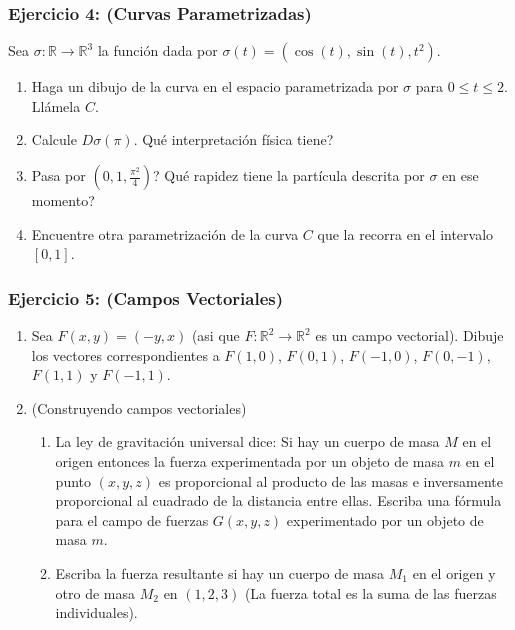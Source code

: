 \documentclass{beamer}
\begin{document}
\begin{frame}
\frametitle{Ejercicio 4: (Curvas Parametrizadas)}
Sea $\sigma: \mathbb{R}\rightarrow \mathbb{R}^3$ la funci\'on dada por $\sigma(t)=(\cos(t),\sin(t), t^2)$.
\begin{enumerate}
\item Haga un dibujo de la curva en el espacio parametrizada por $\sigma$ para $0\leq t\leq 2$. Ll\'amela $C$.
\item Calcule $D\sigma(\pi)$. Qu\'e interpretaci\'on f\'isica tiene?
\item Pasa por $(0,1,\frac{\pi^2}{4})$? Qu\'e rapidez tiene la part\'icula descrita por $\sigma$ en ese momento?
\item Encuentre otra parametrizaci\'on de la curva $C$ que la recorra en el intervalo $[0,1]$.
\end{enumerate}
\end{frame}

\begin{frame}
\frametitle{Ejercicio 5: (Campos Vectoriales)}
\begin{enumerate}

\item Sea $F(x,y)=(-y,x)$ (asi que $F:\mathbb{R}^2\rightarrow \mathbb{R}^2$ es un campo vectorial). Dibuje los vectores correspondientes a $F(1,0)$, $F(0,1)$, $F(-1,0)$, $F(0,-1)$, $F(1,1)$ y $F(-1,1)$. 

\item (Construyendo campos vectoriales)
\begin{enumerate}
\item La ley de gravitaci\'on universal dice: Si hay un cuerpo de masa $M$ en el origen entonces la fuerza experimentada por un objeto de masa $m$ en el punto $(x,y,z)$ es proporcional al producto de las masas e inversamente proporcional al cuadrado de la distancia entre ellas. Escriba una f\'ormula para el campo de fuerzas $G(x,y,z)$ experimentado por un objeto de masa $m$.
\item Escriba la fuerza resultante si hay un cuerpo de masa $M_1$ en el origen y otro de masa $M_2$ en $(1,2,3)$ (La fuerza total es la suma de las fuerzas individuales).
\end{enumerate}
\end{enumerate}

 

\end{frame}
\end{document}
